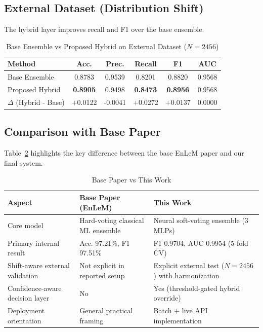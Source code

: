 ﻿\documentclass[conference]{IEEEtran}
\begin{document}
\subsection{External Dataset (Distribution Shift)}
The hybrid layer improves recall and F1 over the base ensemble.

\begin{table}[t]
\centering
\footnotesize
\caption{Base Ensemble vs Proposed Hybrid on External Dataset ($N=2456$)}
\label{tab:external}
\begin{tabular}{lccccc}
\toprule
\textbf{Method} & \textbf{Acc.} & \textbf{Prec.} & \textbf{Recall} & \textbf{F1} & \textbf{AUC} \\
\midrule
Base Ensemble & 0.8783 & 0.9539 & 0.8201 & 0.8820 & 0.9568 \\
Proposed Hybrid & \textbf{0.8905} & 0.9498 & \textbf{0.8473} & \textbf{0.8956} & 0.9568 \\
$\Delta$ (Hybrid - Base) & +0.0122 & -0.0041 & +0.0272 & +0.0137 & 0.0000 \\
\bottomrule
\end{tabular}
\end{table}

\subsection{Comparison with Base Paper}
Table~\ref{tab:basecmp} highlights the key difference between the base EnLeM paper and our final system.

\begin{table}[t]
\centering
\footnotesize
\caption{Base Paper vs This Work}
\label{tab:basecmp}
\begin{tabular}{p{2.35cm}p{2.05cm}p{2.15cm}}
\toprule
\textbf{Aspect} & \textbf{Base Paper (EnLeM) \cite{zhou2025enlem}} & \textbf{This Work} \\
\midrule
Core model & Hard-voting classical ML ensemble & Neural soft-voting ensemble (3 MLPs) \\
Primary internal result & Acc. 97.21\%, F1 97.51\% & F1 0.9704, AUC 0.9954 (5-fold CV) \\
Shift-aware external validation & Not explicit in reported setup & Explicit external test ($N=2456$) with harmonization \\
Confidence-aware decision layer & No & Yes (threshold-gated hybrid override) \\
Deployment orientation & General practical framing & Batch + live API implementation \\
\bottomrule
\end{tabular}
\end{table}
\end{document}
